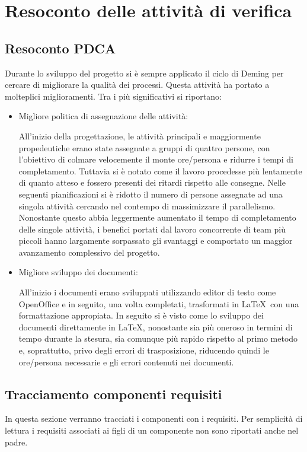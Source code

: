 \newpage
\section{Resoconto delle attività di verifica}

\subsection{Resoconto PDCA}

Durante lo sviluppo del progetto si è sempre applicato il ciclo di Deming per cercare di migliorare la qualità dei processi. Questa attività ha portato a molteplici miglioramenti.
Tra i più significativi si riportano:
\begin{itemize}


\item Migliore politica di assegnazione delle attività: 

All'inizio della progettazione, le attività principali e maggiormente propedeutiche erano state assegnate a gruppi di quattro persone, con l'obiettivo di colmare velocemente il monte ore/persona e ridurre i tempi di completamento. Tuttavia si è notato come il lavoro procedesse più lentamente di quanto atteso e fossero presenti dei ritardi rispetto alle consegne. Nelle seguenti pianificazioni si è ridotto il numero di persone assegnate ad una singola attività cercando nel contempo di massimizzare il parallelismo. Nonostante questo abbia leggermente aumentato il tempo di completamento delle singole attività, i benefici portati dal lavoro concorrente di team più piccoli hanno largamente sorpassato gli svantaggi e comportato un maggior avanzamento complessivo del progetto.

\item Migliore sviluppo dei documenti:

All'inizio i documenti erano sviluppati utilizzando editor di testo come OpenOffice e in seguito, una volta completati, trasformati in \LaTeX\ con una formattazione appropiata.
In seguito si è visto come lo sviluppo dei documenti direttamente in \LaTeX, nonostante sia più oneroso in termini di tempo durante la stesura, sia comunque più rapido rispetto al primo metodo e, soprattutto, privo degli errori di trasposizione, riducendo quindi le ore/persona necessarie e gli errori contenuti nei documenti.

\end{itemize}


\subsection{Tracciamento componenti requisiti}
In questa sezione verranno tracciati i componenti con i requisiti. Per semplicità di lettura i requisiti associati ai figli di un componente non sono riportati anche nel padre.


